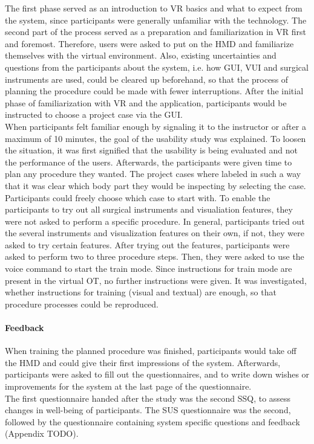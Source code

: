 The first phase served as an introduction to VR basics and what to expect from the system, since participants were generally unfamiliar with the technology.
The second part of the process served as a preparation and familiarization in VR first and foremost.
Therefore, users were asked to put on the HMD and familiarize themselves with the virtual environment.
Also, existing uncertainties and questions from the participants about the system, i.e. how GUI, VUI and surgical instruments are used, could be cleared up beforehand, so that the process of 
planning the procedure could be made with fewer interruptions.
After the initial phase of familiarization with VR and the application, participants would be instructed to choose a project case via the GUI.
\\ When participants felt familiar enough by signaling it to the instructor or after a maximum of 10 minutes, the goal of the usability study was explained.
To loosen the situation, it was first signified that the usability is being evaluated and not the performance of the users.
Afterwards, the participants were given time to plan any procedure they wanted.
The project cases where labeled in such a way that it was clear which body part they would be inspecting by selecting the case.
Participants could freely choose which case to start with.
To enable the participants to try out all surgical instruments and visualiation features, they were not asked to perform a specific procedure.
In general, participants tried out the several instruments and visualization features on their own, if not, they were asked to try certain features.
After trying out the features, participants were asked to perform two to three procedure steps.
Then, they were asked to use the voice command to start the train mode.
Since instructions for train mode are present in the virtual OT, no further instructions were given.
It was investigated, whether instructions for training (visual and textual) are enough, so that procedure processes could be reproduced.

\paragraph{\textbf{Feedback}}

When training the planned procedure was finished, participants would take off the HMD and could give their first impressions of the system.
Afterwards, participants were asked to fill out the questionnaires, and to write down wishes or improvements for the system at the last page of the questionnaire.
\\ The first questionnaire handed after the study was the second SSQ, to assess changes in well-being of participants.
The SUS questionnaire was the second, followed by the questionnaire containing system specific questions and feedback (Appendix TODO).

